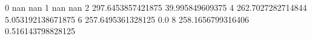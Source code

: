 0 nan nan
1 nan nan
2 297.6453857421875 39.995849609375
4 262.7027282714844 5.053192138671875
6 257.6495361328125 0.0
8 258.1656799316406 0.516143798828125

